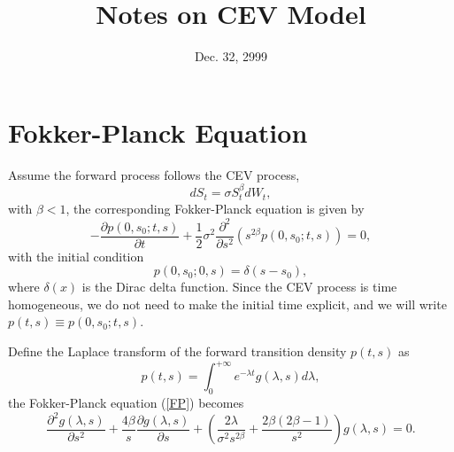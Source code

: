 \documentclass[12pt]{article}
\begin{document}
\title{Notes on CEV Model}
\date{Dec. 32, 2999}

\maketitle

\section{Fokker-Planck Equation}

  Assume the forward process follows the CEV process,
  \begin{equation}
    dS_t=\sigma S_t^{\beta}dW_t,
    \label{CEV}
  \end{equation}
  with $\beta < 1$, the corresponding Fokker-Planck equation is given by
  \begin{equation}
    -\frac{\partial p(0,s_0;t,s)}{\partial t}+\frac{1}{2}\sigma^2\frac{\partial^2}{\partial s^2}
    \left(s^{2\beta}p(0,s_0;t,s)\right) = 0,
    \label{FP}
  \end{equation}
  with the initial condition
  \begin{equation}
    p(0,s_0;0,s) = \delta(s-s_0),
    \label{initial}
  \end{equation}
  where $\delta(x)$ is the Dirac delta function. Since the CEV process is time homogeneous, we do not need
  to make the initial time explicit, and we will write $p(t,s)\equiv p(0,s_0;t,s)$.

  Define the Laplace transform of the forward transition density $p(t,s)$ as \cite{Lesniewski}
  \begin{equation}
    p(t,s)=\int_0^{+\infty}e^{-\lambda t}g(\lambda, s)d\lambda,
    \label{Laplace}
  \end{equation}
  the Fokker-Planck equation (\ref{FP}) becomes
  \begin{equation}
    \frac{\partial^2g(\lambda,s)}{\partial s^2}+\frac{4\beta}{s}\frac{\partial g(\lambda,s)}{\partial s}
    + \left(\frac{2\lambda}{\sigma^2 s^{2\beta}}+\frac{2\beta(2\beta-1)}{s^2}\right)g(\lambda, s) = 0.
    \label{FP2}
  \end{equation}
\end{document}

